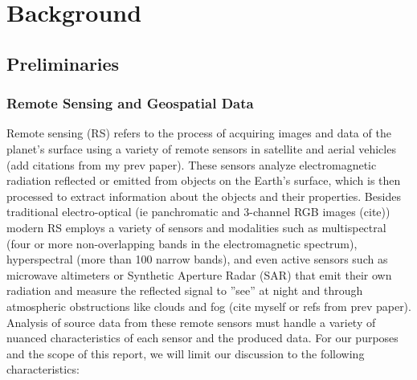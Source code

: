 \section{Background}

\begin{multicols}{2}

\subsection{Preliminaries}

\subsubsection{Remote Sensing and Geospatial Data}

Remote sensing (RS) refers to the process of acquiring images and data of the planet’s surface using a variety of remote sensors in satellite and aerial vehicles (add citations from my prev paper). 
These sensors analyze electromagnetic radiation reflected or emitted from objects on the Earth’s surface, which is then processed to extract information about the objects and their properties. 
Besides traditional electro-optical (ie panchromatic and 3-channel RGB images (cite)) modern RS employs a variety of sensors and modalities such as multispectral 
(four or more non-overlapping bands in the electromagnetic spectrum), hyperspectral (more than 100 narrow bands), and even active sensors such as microwave altimeters or Synthetic
Aperture Radar (SAR) that emit their own radiation and measure the reflected signal to ”see” at night and through atmospheric obstructions like clouds and fog (cite myself or refs from prev paper). 
Analysis of source data from these remote sensors must handle a variety of nuanced characteristics of each sensor and the produced data. For our purposes and the scope of this report, we will limit our discussion
to the following characteristics: 


\end{multicols}
